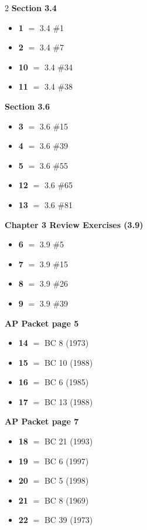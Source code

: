 \documentclass[11pt]{article}
\begin{document}
\begin{multicols}{2}
\noindent\textbf{Section 3.4}
\begin{itemize}[leftmargin=1.6em,itemsep=1pt,topsep=2pt]
  \item[] \textbf{1} $=$ 3.4 \#1
  \item[] \textbf{2} $=$ 3.4 \#7
  \item[] \textbf{10} $=$ 3.4 \#34
  \item[] \textbf{11} $=$ 3.4 \#38
\end{itemize}

\smallskip
\noindent\textbf{Section 3.6}
\begin{itemize}[leftmargin=1.6em,itemsep=1pt,topsep=2pt]
  \item[] \textbf{3} $=$ 3.6 \#15
  \item[] \textbf{4} $=$ 3.6 \#39
  \item[] \textbf{5} $=$ 3.6 \#55
  \item[] \textbf{12} $=$ 3.6 \#65
  \item[] \textbf{13} $=$ 3.6 \#81
\end{itemize}

\smallskip
\noindent\textbf{Chapter 3 Review Exercises (3.9)}
\begin{itemize}[leftmargin=1.6em,itemsep=1pt,topsep=2pt]
  \item[] \textbf{6} $=$ 3.9 \#5
  \item[] \textbf{7} $=$ 3.9 \#15
  \item[] \textbf{8} $=$ 3.9 \#26
  \item[] \textbf{9} $=$ 3.9 \#39
\end{itemize}

\smallskip
\noindent\textbf{AP Packet page 5}
\begin{itemize}[leftmargin=1.6em,itemsep=1pt,topsep=2pt]
  \item[] \textbf{14} $=$ BC 8 (1973)
  \item[] \textbf{15} $=$ BC 10 (1988)
  \item[] \textbf{16} $=$ BC 6 (1985)
  \item[] \textbf{17} $=$ BC 13 (1988)
\end{itemize}

\smallskip
\noindent\textbf{AP Packet page 7}
\begin{itemize}[leftmargin=1.6em,itemsep=1pt,topsep=2pt]
  \item[] \textbf{18} $=$ BC 21 (1993)
  \item[] \textbf{19} $=$ BC 6 (1997)
  \item[] \textbf{20} $=$ BC 5 (1998)
  \item[] \textbf{21} $=$ BC 8 (1969)
  \item[] \textbf{22} $=$ BC 39 (1973)
\end{itemize}


\end{multicols}
\end{document}
